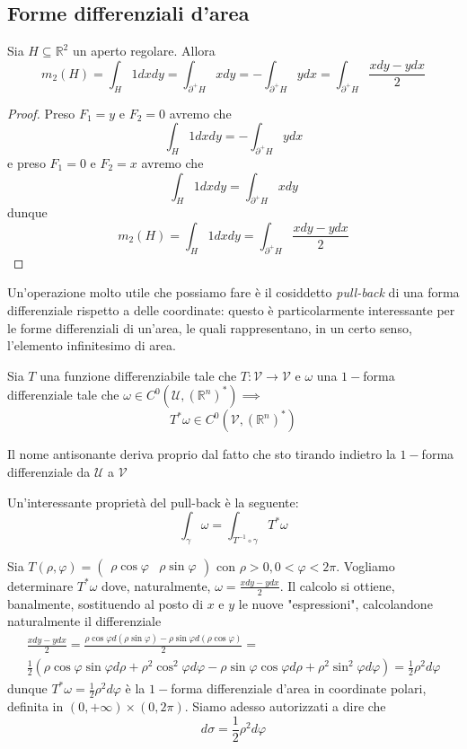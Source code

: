\subsection{Forme differenziali d'area}
\begin{prop}
	Sia $H \subseteq \mathbb{R}^2$ un aperto regolare. Allora
	$$
	m_2(H) = \int_H 1dxdy = \int_{\partial^{+} H} xdy = - \int_{\partial^{+} H} ydx = \int_{\partial^{+} H}	 \frac{xdy - ydx}{2}
	$$
\end{prop}
\begin{proof}
Preso $F_1=y$ e $F_2 = 0$ avremo che
$$
\int_H 1dxdy = -\int_{\partial^{+} H} ydx
$$
e preso $F_1 = 0$ e $F_2 = x$ avremo che
$$
\int_H 1dxdy = \int_{\partial^{+} H} xdy
$$
dunque
$$
m_2(H) = \int_H 1dxdy = \int_{\partial^{+} H} \frac{xdy - ydx}{2} 
$$
\end{proof}
Un'operazione molto utile che possiamo fare è il cosiddetto \emph{pull-back} di una forma differenziale rispetto a delle coordinate: questo è particolarmente interessante per le forme differenziali di un'area, le quali rappresentano, in un certo senso, l'elemento infinitesimo di area.
\begin{definition}
	Sia $T$ una funzione differenziabile tale che $T: \mathcal{V} \to \mathcal{V}$ e $\omega$ una $1-$forma differenziale tale che $\omega \in C^0(\mathcal{U}, (\mathbb{R}^n)^*) \implies$
	$$
	T^*\omega \in C^0(\mathcal{V}, (\mathbb{R}^n)^*)
	$$
\end{definition}
\begin{remark}
	Il nome antisonante deriva proprio dal fatto che sto tirando indietro la $1-$forma differenziale da $\mathcal{U}$ a $\mathcal{V}$
\end{remark}
Un'interessante proprietà del pull-back è la seguente:
$$
\int_\gamma \omega = \int_{T^{-1} \circ \gamma} T^*\omega
$$
\begin{example}
	Sia $T(\rho, \varphi) = \begin{pmatrix}	\rho \cos{\varphi} & \rho \sin{\varphi} \end{pmatrix}$ con $\rho > 0, 0 < \varphi < 2\pi$. Vogliamo determinare $T^*\omega$ dove, naturalmente, $\omega = \frac{xdy-ydx}{2}$. Il calcolo si ottiene, banalmente, sostituendo al posto di $x$ e $y$ le nuove "espressioni", calcolandone
	naturalmente il differenziale
	\begin{align*}
	&\frac{xdy - ydx}{2} = \frac{\rho \cos{\varphi} d(\rho \sin{\varphi}) - \rho \sin{\varphi} d(\rho \cos{\varphi})}{2} = & \\ 
	&\frac{1}{2} \left( \rho \cos{\varphi} \sin{\varphi} d\rho + \rho^2 \cos^2{\varphi} d\varphi - \rho \sin{\varphi} \cos{\varphi} d\rho + \rho^2 \sin^2{\varphi} d\varphi \right) = \frac{1}{2} \rho^2 d\varphi
	\end{align*}
	dunque $T^*\omega = \frac{1}{2} \rho^2 d\varphi$ è la $1-$forma differenziale d'area in coordinate polari, definita in $(0, +\infty) \times (0, 2\pi)$. Siamo adesso autorizzati a dire che
	$$
	d\sigma = \frac{1}{2} \rho^2 d\varphi
	$$
\end{example}

